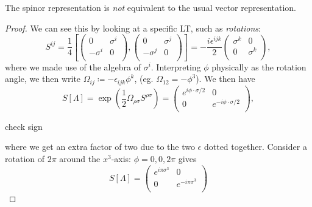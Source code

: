 \begin{claim}
  The spinor representation is \emph{not} equivalent to the usual vector representation.
\end{claim}
\begin{proof}
  We can see this by looking at a specific LT, such as \emph{rotations}:
  \begin{equation}
    S^{ij} = \frac{1}{4} \left[	
      \begin{pmatrix}
       0 & \sigma^i \\
       -\sigma^i & 0 \\
      \end{pmatrix},
      \begin{pmatrix}
       0 & \sigma^j \\
       -\sigma^j & 0 \\
      \end{pmatrix}
    \right]
    = -\frac{i \epsilon^{ijk}}{2} 
    \begin{pmatrix}
     \sigma^k & 0 \\
     0 & \sigma^k \\
    \end{pmatrix},
  \end{equation}
  where we made use of the algebra of $\sigma^i$. Interpreting $\phi$ physically as the rotation angle, we then write $\Omega_{ij} \coloneqq -\epsilon_{ijk} \phi^k$, (eg. $\Omega_{12} = -\phi^3$). We then have
  \begin{equation}
    S[\Lambda] = \exp(\frac{1}{2} \Omega_{\rho\sigma} S^{\rho\sigma}) = 
    \begin{pmatrix}
     e^{i \phi \cdot \sigma/2} & 0 \\
     0 & e^{-i \phi \cdot \sigma /2} \\
    \end{pmatrix},
  \end{equation}
  \begin{leftbar}
    \begin{remark}
      check sign
    \end{remark}
  \end{leftbar}
  where we get an extra factor of two due to the two $\epsilon$ dotted together.
  Consider a rotation of $2\pi$ around the $x^3$-axis: $\phi = 0,0, 2 \pi$ gives
  \begin{equation}
    S[\Lambda] = 
    \begin{pmatrix}
      e^{i\pi \sigma^3} & 0 \\
      0 & e^{-i\pi \sigma^3} \\

\end{pmatrix}
\end{equation}
\end{proof}
